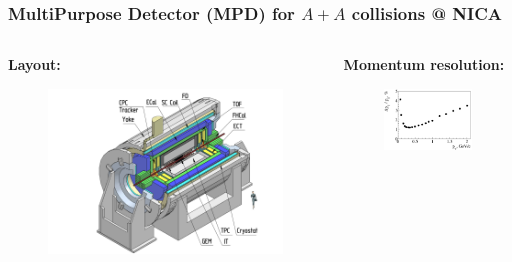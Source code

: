 \documentclass[dvipsnames] {beamer}
\begin{document}
\begin{frame}[shrink=25]
  \bf
  \frametitle{\centering \bf {\small MultiPurpose Detector (MPD) for $A + A$ collisions @ NICA}}
  \begin{columns}[c]
    \begin{block}{\bf \centering Layout:}
      \begin{figure}[H]
        \includegraphics[width=.96\textwidth]{mpd.png}
      \end{figure}
    \end{block}
    \begin{block}{\bf \centering Momentum resolution:}
    \begin{figure}[H]
        \includegraphics[width=.96\textwidth]{mom_res_mpd.png}
      \end{figure}    	
    \end{block}


\end{columns}
\end{frame}
\end{document}
